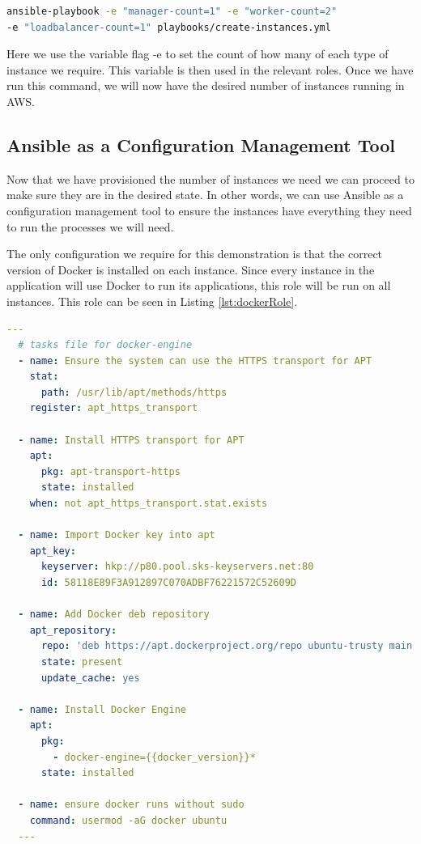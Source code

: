 \documentclass{article}
\begin{document}
\begin{lstlisting}[language=bash]
ansible-playbook -e "manager-count=1" -e "worker-count=2" 
-e "loadbalancer-count=1" playbooks/create-instances.yml
\end{lstlisting}

Here we use the variable flag -e to set the count of how many of each type of instance we require. This variable is then used in the relevant roles. Once we have run this command, we will now have the desired number of instances running in AWS.

\subsection{Ansible as a Configuration Management Tool}
\label{subs:config_management}
Now that we have provisioned the number of instances we need we can proceed to make sure they are in the desired state. In other words, we can use Ansible as a configuration management tool to ensure the instances have everything they need to run the processes we will need. 

The only configuration we require for this demonstration is that the correct version of Docker is installed on each instance. Since every instance in the application will use Docker to run its applications, this role will be run on all instances. This role can be seen in Listing \ref{lst:dockerRole}.

\begin{lstlisting}[float,floatplacement=!htbp,language=yaml,caption={Role to install Docker on a Ubuntu Instance},label={lst:dockerRole},basicstyle=\scriptsize]
  ---
  # tasks file for docker-engine
  - name: Ensure the system can use the HTTPS transport for APT
    stat:
      path: /usr/lib/apt/methods/https
    register: apt_https_transport

  - name: Install HTTPS transport for APT
    apt:
      pkg: apt-transport-https
      state: installed
    when: not apt_https_transport.stat.exists

  - name: Import Docker key into apt
    apt_key:
      keyserver: hkp://p80.pool.sks-keyservers.net:80
      id: 58118E89F3A912897C070ADBF76221572C52609D

  - name: Add Docker deb repository
    apt_repository:
      repo: 'deb https://apt.dockerproject.org/repo ubuntu-trusty main'
      state: present
      update_cache: yes
      
  - name: Install Docker Engine
    apt:
      pkg:
        - docker-engine={{docker_version}}*
      state: installed

  - name: ensure docker runs without sudo
    command: usermod -aG docker ubuntu
  ---
\end{lstlisting}
\end{document}
